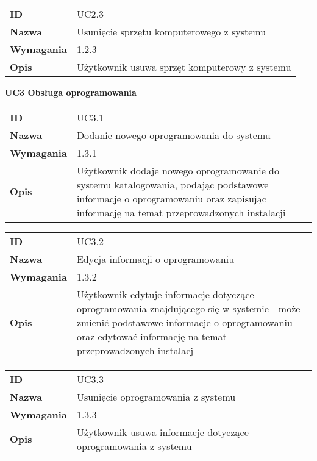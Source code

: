 \vspace{.05\textheight}

\begin{tabular}{p{}p{}}
\hfill {\bf ID} & UC2.3 \\
\hfill {\bf Nazwa} & Usunięcie sprzętu komputerowego z systemu \\
\hfill {\bf Wymagania} & 1.2.3 \\
\hfill {\bf Opis} & Użytkownik usuwa sprzęt komputerowy z systemu \\
\end{tabular}

\vspace{.03\textheight}
\begin{center}
  {\Large\bf UC3 Obsługa oprogramowania} \\
\end{center}
\vspace{.02\textheight}


\begin{tabular}{p{}p{}}
\hfill {\bf ID} & UC3.1 \\
\hfill {\bf Nazwa} & Dodanie nowego oprogramowania do systemu \\
\hfill {\bf Wymagania} & 1.3.1 \\
\hfill {\bf Opis} & Użytkownik dodaje nowego oprogramowanie do systemu katalogowania, podając podstawowe informacje o oprogramowaniu oraz zapisując informację na temat przeprowadzonych instalacji \\
\end{tabular}

\vspace{.05\textheight}

\begin{tabular}{p{}p{}}
\hfill {\bf ID} & UC3.2 \\
\hfill {\bf Nazwa} &  Edycja informacji o oprogramowaniu \\
\hfill {\bf Wymagania} & 1.3.2 \\
\hfill {\bf Opis} & Użytkownik edytuje informacje dotyczące oprogramowania znajdującego się w systemie - może zmienić podstawowe informacje o oprogramowaniu oraz edytować informację na temat przeprowadzonych instalacj \\
\end{tabular}

\vspace{.05\textheight}

\begin{tabular}{p{}p{}}
\hfill {\bf ID} & UC3.3 \\
\hfill {\bf Nazwa} & Usunięcie oprogramowania z systemu \\
\hfill {\bf Wymagania} & 1.3.3 \\
\hfill {\bf Opis} & Użytkownik usuwa informacje dotyczące oprogramowania z systemu \\
\end{tabular}

